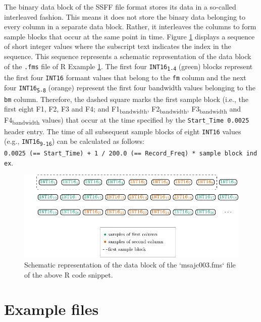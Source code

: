 \documentclass[]{book}
\theoremstyle{definition}
\theoremstyle{definition}
\theoremstyle{definition}
\theoremstyle{remark}
\begin{document}
The binary data block of the SSFF file format stores its data in a
so-called interleaved fashion. This means it does not store the binary
data belonging to every column in a separate data block. Rather, it
interleaves the columns to form sample blocks that occur at the same
point in time. Figure \ref{fig:wrassp-ssffDataBlock} displays a sequence
of short integer values where the subscript text indicates the index in
the sequence. This sequence represents a schematic representation of the
data block of the \texttt{.fms} file of R Example
\ref{fig:wrassp-ssffDataBlock}. The first four
{\texttt{INT16}\textsubscript{\texttt{1-4}}} (green) blocks represent
the first four \texttt{INT16} formant values that belong to the
\texttt{fm} column and the next four
{\texttt{INT16}\textsubscript{\texttt{5-8}}} (orange) represent the
first four bandwidth values belonging to the \texttt{bm} column.
Therefore, the dashed square marks the first sample block (i.e., the
first eight F1, F2, F3 and F4; and F1\textsubscript{bandwidth},
F2\textsubscript{bandwidth}, F3\textsubscript{bandwidth} and
F4\textsubscript{bandwidth} values) that occur at the time specified by
the \texttt{Start\_Time\ 0.0025} header entry. The time of all
subsequent sample blocks of eight \texttt{INT16} values (e.g.,
\texttt{INT16}\textsubscript{\texttt{9-16}}) can be calculated as
follows:
\texttt{0.0025\ (==\ Start\_Time)\ +\ 1\ /\ 200.0\ (==\ Record\_Freq)\ *\ sample\ block\ index}.

\begin{figure}

{\centering \includegraphics[width=1\linewidth]{pics/ssffDataBlock} 

}

\caption{Schematic representation of the data block of the `msajc003.fms` file of the above R code snippet.}\label{fig:wrassp-ssffDataBlock}
\end{figure}

\hypertarget{example-files}{%
\section{Example files}\label{example-files}}
\end{document}
